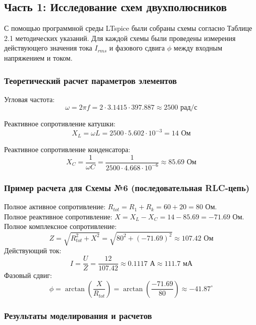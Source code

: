 \documentclass[a4paper,12pt]{article}
\begin{document}
\subsection{Часть 1: Исследование схем двухполюсников}
С помощью программной среды LTspice были собраны схемы согласно Таблице 2.1 методических указаний. Для каждой схемы были проведены измерения действующего значения тока $I_{rms}$ и фазового сдвига $\phi$ между входным напряжением и током.

\subsubsection{Теоретический расчет параметров элементов}
Угловая частота:
$$\omega = 2\pi f = 2 \cdot 3.1415 \cdot 397.887 \approx 2500 \text{ рад/с}$$

Реактивное сопротивление катушки:
$$X_L = \omega L = 2500 \cdot 5.602 \cdot 10^{-3} = 14 \text{ Ом}$$

Реактивное сопротивление конденсатора:
$$X_C = \frac{1}{\omega C} = \frac{1}{2500 \cdot 4.668 \cdot 10^{-6}} \approx 85.69 \text{ Ом}$$

\subsubsection{Пример расчета для Схемы №6 (последовательная RLC-цепь)}
Полное активное сопротивление: $R_{tot} = R_1 + R_k = 60 + 20 = 80$ Ом. \\
Полное реактивное сопротивление: $X = X_L - X_C = 14 - 85.69 = -71.69$ Ом. \\
Полное комплексное сопротивление:
$$Z = \sqrt{R_{tot}^2 + X^2} = \sqrt{80^2 + (-71.69)^2} \approx 107.42 \text{ Ом}$$
Действующий ток:
$$I = \frac{U}{Z} = \frac{12}{107.42} \approx 0.1117 \text{ А} \approx 111.7 \text{ мА}$$
Фазовый сдвиг:
$$\phi = \arctan\left(\frac{X}{R_{tot}}\right) = \arctan\left(\frac{-71.69}{80}\right) \approx -41.87^\circ$$

\subsubsection{Результаты моделирования и расчетов}
\end{document}
